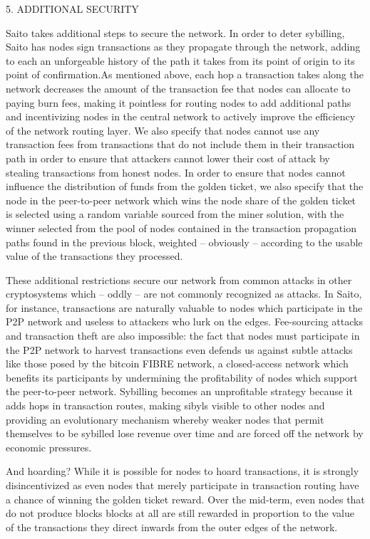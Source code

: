 \documentclass[11.5pt, oneside]{article}   	%
\begin{document}
\begin{multicols}{2}
5. ADDITIONAL SECURITY

Saito takes additional steps to secure the network. In order to deter sybilling, Saito has nodes sign transactions as they propagate through the network, adding to each an unforgeable history of the path it takes from its point of origin to its point of confirmation.As mentioned above, each hop a transaction takes along the network decreases the amount of the transaction fee that nodes can allocate to paying burn fees, making it pointless for routing nodes to add additional paths and incentivizing nodes in the central network to actively improve the efficiency of the network routing layer. We also specify that nodes cannot use any transaction fees from transactions that do not include them in their transaction path in order to ensure that attackers cannot lower their cost of attack by stealing transactions from honest nodes. In order to ensure that nodes cannot influence the distribution of funds from the golden ticket, we also specify that the node in the peer-to-peer network which wins the node share of the golden ticket is selected using a random variable sourced from the miner solution, with the winner selected from the pool of nodes contained in the transaction propagation paths found in the previous block, weighted -- obviously -- according to the usable value of the transactions they processed.

These additional restrictions secure our network from common attacks in other cryptosystems which -- oddly -- are not commonly recognized as attacks. In Saito, for instance, transactions are naturally valuable to nodes which participate in the P2P network and useless to attackers who lurk on the edges. Fee-sourcing attacks and transaction theft are also impossible: the fact that nodes must participate in the P2P network to harvest transactions even defends us against subtle attacks like those posed by the bitcoin FIBRE network, a closed-access network which benefits its participants by undermining the profitability of nodes which support the peer-to-peer network. Sybilling becomes an unprofitable strategy because it adds hops in transaction routes, making sibyls visible to other nodes and providing an evolutionary mechanism whereby weaker nodes that permit themselves to be sybilled lose revenue over time and are forced off the network by economic pressures. 

And hoarding? While it is possible for nodes to hoard transactions, it is strongly disincentivized as even nodes that merely participate in transaction routing have a chance of winning the golden ticket reward. Over the mid-term, even nodes that do not produce blocks blocks at all are still rewarded in proportion to the value of the transactions they direct inwards from the outer edges of the network.


\end{multicols}
\end{document}
